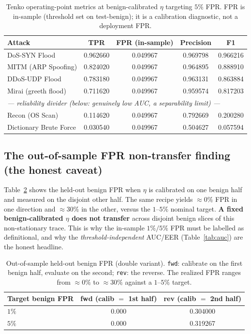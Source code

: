 \documentclass[11pt]{article}
\begin{document}
\begin{table}[t]
\centering
\caption{Tenko operating-point metrics at benign-calibrated $\eta$ targeting $5\%$ FPR. FPR is
in-sample (threshold set on test-benign); it is a calibration diagnostic, not a deployment FPR.}
\label{tab:op}
\begin{tabular}{lcccc}
\toprule
\textbf{Attack} & \textbf{TPR} & \textbf{FPR (in-sample)} & \textbf{Precision} & \textbf{F1} \\
\midrule
DoS-SYN Flood          & 0.962660 & 0.049967 & 0.969798 & 0.966216 \\
MITM (ARP Spoofing)    & 0.824020 & 0.049967 & 0.964895 & 0.888910 \\
DDoS-UDP Flood         & 0.783180 & 0.049967 & 0.963131 & 0.863884 \\
Mirai (greeth flood)   & 0.711620 & 0.049967 & 0.959574 & 0.817203 \\
\midrule
\multicolumn{5}{l}{\emph{--- reliability divider (below: genuinely low AUC, a separability limit) ---}} \\
\midrule
Recon (OS Scan)        & 0.114620 & 0.049967 & 0.792669 & 0.200280 \\
Dictionary Brute Force & 0.030540 & 0.049967 & 0.504627 & 0.057594 \\
\bottomrule
\end{tabular}
\end{table}

\subsection{The out-of-sample FPR non-transfer finding (the honest caveat)}
\label{sec:res-oos}

Table~\ref{tab:oos} shows the held-out benign FPR when $\eta$ is calibrated on one benign half and
measured on the disjoint other half. The same recipe yields $\approx 0\%$ FPR in one direction and
$\approx 30\%$ in the other, versus the $1$--$5\%$ nominal target. \textbf{A fixed benign-calibrated
$\eta$ does not transfer} across disjoint benign slices of this non-stationary trace. This is why the
in-sample $1\%/5\%$ FPR must be labelled as definitional, and why the \emph{threshold-independent}
AUC/EER (Table~\ref{tab:auc}) are the honest headline.

\begin{table}[t]
\centering
\caption{Out-of-sample held-out benign FPR (double variant). \texttt{fwd}: calibrate on the first
benign half, evaluate on the second; \texttt{rev}: the reverse. The realized FPR ranges from
$\approx 0\%$ to $\approx 30\%$ against a $1$--$5\%$ target.}
\label{tab:oos}
\begin{tabular}{lcc}
\toprule
\textbf{Target benign FPR} & \textbf{fwd (calib $=$ 1st half)} & \textbf{rev (calib $=$ 2nd half)} \\
\midrule
$1\%$ & 0.000 & 0.304000 \\
$5\%$ & 0.000 & 0.319267 \\
\bottomrule
\end{tabular}
\end{table}
\end{document}
